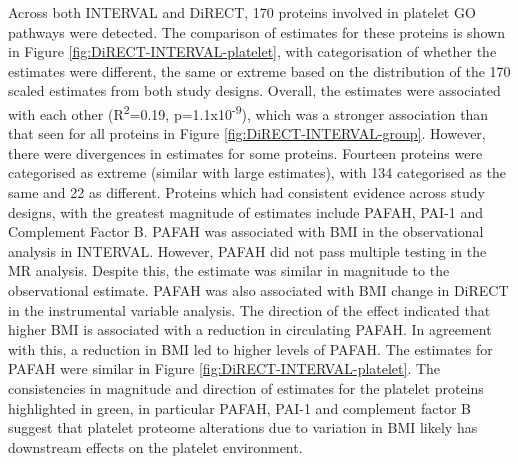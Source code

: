 \documentclass[11pt,twoside]{bristolthesis}
\begin{document}
Across both INTERVAL and DiRECT, 170 proteins involved in platelet GO pathways were detected. The comparison of estimates for these proteins is shown in Figure \ref{fig:DiRECT-INTERVAL-platelet}, with categorisation of whether the estimates were different, the same or extreme based on the distribution of the 170 scaled estimates from both study designs. Overall, the estimates were associated with each other (R\textsuperscript{2}=0.19, p=1.1x10\textsuperscript{-9}), which was a stronger association than that seen for all proteins in Figure \ref{fig:DiRECT-INTERVAL-group}. However, there were divergences in estimates for some proteins. Fourteen proteins were categorised as extreme (similar with large estimates), with 134 categorised as the same and 22 as different. Proteins which had consistent evidence across study designs, with the greatest magnitude of estimates include PAFAH, PAI-1 and Complement Factor B. PAFAH was associated with BMI in the observational analysis in INTERVAL. However, PAFAH did not pass multiple testing in the MR analysis. Despite this, the estimate was similar in magnitude to the observational estimate. PAFAH was also associated with BMI change in DiRECT in the instrumental variable analysis. The direction of the effect indicated that higher BMI is associated with a reduction in circulating PAFAH. In agreement with this, a reduction in BMI led to higher levels of PAFAH. The estimates for PAFAH were similar in Figure \ref{fig:DiRECT-INTERVAL-platelet}. The consistencies in magnitude and direction of estimates for the platelet proteins highlighted in green, in particular PAFAH, PAI-1 and complement factor B suggest that platelet proteome alterations due to variation in BMI likely has downstream effects on the platelet environment.
\end{document}
